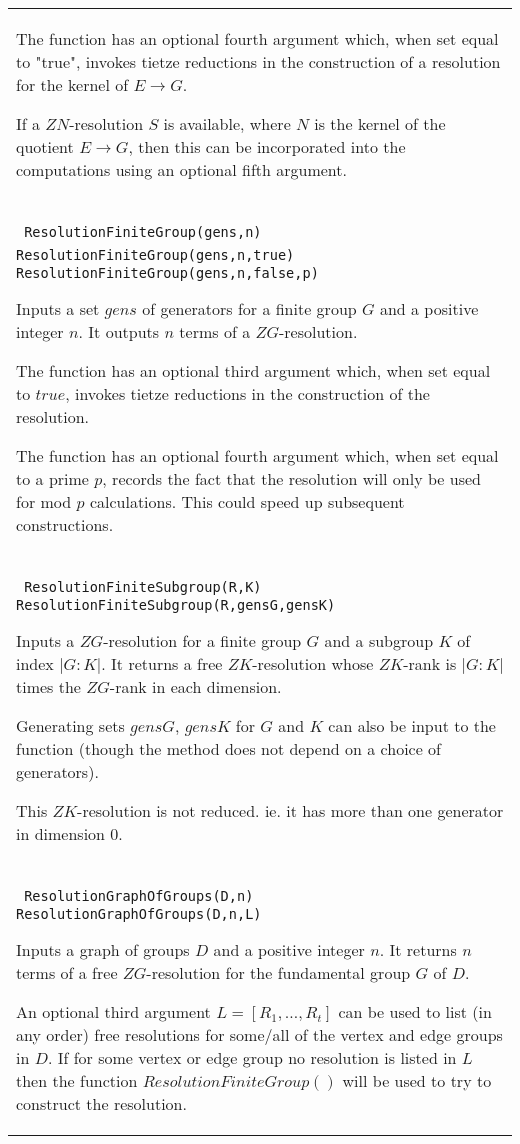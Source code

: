 \documentclass[a4paper,11pt]{report}
\begin{document}
{\begin{center}
\begin{tabular}{|l|}
 The function has an optional fourth argument which, when set equal to "true",
invokes tietze reductions in the construction of a resolution for the kernel
of $E \longrightarrow G$.

 If a $ZN$-resolution $S$ is available, where $N$ is the kernel of the quotient $E \longrightarrow G$, then this can be incorporated into the computations using an optional fifth
argument. \\
 \index{ResolutionFiniteGroup} \texttt{ ResolutionFiniteGroup(gens,n)} {\nobreakspace} \texttt{ ResolutionFiniteGroup(gens,n,true)} {\nobreakspace} \texttt{ ResolutionFiniteGroup(gens,n,false,p) }

 Inputs a set $gens$ of generators for a finite group $G$ and a positive integer $n$. It outputs $n$ terms of a $ZG$-resolution.

 The function has an optional third argument which, when set equal to $true$, invokes tietze reductions in the construction of the resolution. 

 The function has an optional fourth argument which, when set equal to a prime $p$, records the fact that the resolution will only be used for mod $p$ calculations. This could speed up subsequent constructions. 

 \\
 \index{ResolutionFiniteSubgroup} \texttt{ ResolutionFiniteSubgroup(R,K)} {\nobreakspace} \texttt{ ResolutionFiniteSubgroup(R,gensG,gensK)} 

 Inputs a $ZG$-resolution for a finite group $G$ and a subgroup $K$ of index $|G:K|$. It returns a free $ZK$-resolution whose $ZK$-rank is $|G:K|$ times the $ZG$-rank in each dimension.

 Generating sets $gensG$, $gensK$ for $G$ and $K$ can also be input to the function (though the method does not depend on a
choice of generators).

 This $ZK$-resolution is not reduced. ie. it has more than one generator in dimension $0$. \\
 \index{ResolutionGraphOfGroups} \texttt{ ResolutionGraphOfGroups(D,n) } {\nobreakspace} \texttt{ ResolutionGraphOfGroups(D,n,L) } 

 Inputs a graph of groups $D$ and a positive integer $n$. It returns $n$ terms of a free $ZG$-resolution for the fundamental group $G$ of $D$.

 An optional third argument $L=[R_1 , \ldots , R_t]$ can be used to list (in any order) free resolutions for some/all of the vertex
and edge groups in $D$. If for some vertex or edge group no resolution is listed in $L$ then the function $ResolutionFiniteGroup()$ will be used to try to construct the resolution. 


\end{tabular}
\end{center}}
\end{document}
